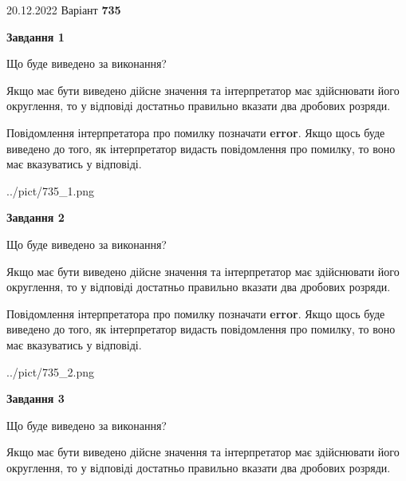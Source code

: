 \documentclass[12pt, ukrainian]{article}
\begin{document}
{20.12.2022 Варіант \No \textbf { 735 }\par}
{
\begin {Large}

{\begin {center}\textbf{Завдання 1}\end {center}}\par
Що буде виведено за виконання? \par

Якщо має бути виведено дійсне значення та інтерпретатор має здійснювати його округлення, 
то у відповіді достатньо правильно вказати два дробових розряди.

Повідомлення інтерпретатора про помилку позначати \textbf{error}.
Якщо щось буде виведено до того, як інтерпретатор видасть повідомлення про помилку, 
то воно має вказуватись у відповіді. \par

\begin{center}
	{../pict/735_1.png}
\end{center}
\newpage

{\begin {center}\textbf{Завдання 2}\end {center}}\par
Що буде виведено за виконання? \par

Якщо має бути виведено дійсне значення та інтерпретатор має здійснювати його округлення, 
то у відповіді достатньо правильно вказати два дробових розряди.

Повідомлення інтерпретатора про помилку позначати \textbf{error}.
Якщо щось буде виведено до того, як інтерпретатор видасть повідомлення про помилку, 
то воно має вказуватись у відповіді. \par

\begin{center}
	{../pict/735_2.png}
\end{center}
\newpage

{\begin {center}\textbf{Завдання 3}\end {center}}\par
Що буде виведено за виконання? \par

Якщо має бути виведено дійсне значення та інтерпретатор має здійснювати його округлення, 
то у відповіді достатньо правильно вказати два дробових розряди.


\end{Large}}
\end{document}
